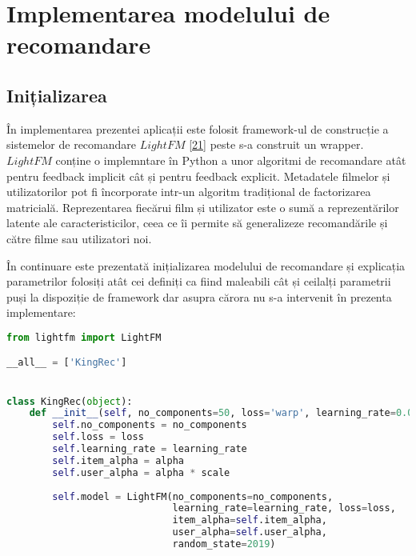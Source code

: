 \section{Implementarea modelului de recomandare}
\subsection{Inițializarea}
În implementarea prezentei aplicații este folosit framework-ul de construcție a sistemelor de recomandare $LightFM$ \hyperlink{lightfm}{[21]} peste s-a construit un wrapper. 
$LightFM$ conține o implemntare în Python a unor algoritmi de recomandare atât pentru feedback implicit cât și pentru feedback explicit. Metadatele filmelor și utilizatorilor pot fi încorporate intr-un algoritm tradițional de factorizarea matricială. Reprezentarea fiecărui film și utilizator este o sumă a reprezentărilor latente ale caracteristicilor, ceea ce îi permite să generalizeze recomandările și către filme sau utilizatori noi.   

În continuare este prezentată inițializarea modelului de recomandare și explicația parametrilor folosiți atât cei definiți ca fiind maleabili cât și ceilalți parametrii puși la dispoziție de framework dar asupra cărora nu s-a intervenit în prezenta implementare:
\begin{lstlisting}[language=Python, caption=Definirea modelului de recomandare]
from lightfm import LightFM

__all__ = ['KingRec']


class KingRec(object):
    def __init__(self, no_components=50, loss='warp', learning_rate=0.05, alpha=0.02, scale=0.07):
        self.no_components = no_components
        self.loss = loss
        self.learning_rate = learning_rate
        self.item_alpha = alpha
        self.user_alpha = alpha * scale
        
        self.model = LightFM(no_components=no_components, 
        					 learning_rate=learning_rate, loss=loss,
                             item_alpha=self.item_alpha, 
                             user_alpha=self.user_alpha, 
                             random_state=2019)                       
\end{lstlisting}

